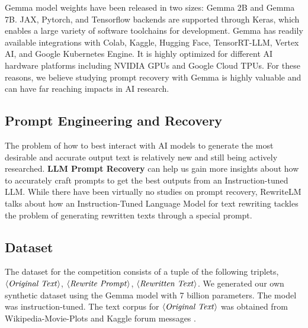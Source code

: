 \documentclass{article}
\theoremstyle{plain}
\theoremstyle{definition}
\theoremstyle{remark}
\begin{document}
Gemma model weights have been released in two sizes: Gemma 2B and Gemma 7B. JAX, Pytorch, and Tensorflow backends are supported through Keras, which enables a large variety of software toolchains for development. Gemma has readily available integrations with Colab, Kaggle, Hugging Face, TensorRT-LLM, Vertex AI, and Google Kubernetes Engine. It is highly optimized for different AI hardware platforms including NVIDIA GPUs and Google Cloud TPUs. For these reasons, we believe studying prompt recovery with Gemma is highly valuable and can have far reaching impacts in AI research.

\subsection{Prompt Engineering and Recovery}
The problem of how to best interact with AI models to generate the most desirable and accurate output text is relatively new and still being actively researched. \textbf{LLM Prompt Recovery} can help us gain more insights about how to accurately craft prompts to get the best outputs from an Instruction-tuned LLM. While there have been virtually no studies on prompt recovery, RewriteLM \cite{shu2023rewritelm} talks about how an Instruction-Tuned Language Model for text rewriting tackles the problem of generating rewritten texts through a special prompt.

\subsection{Dataset}
The dataset for the competition consists of a tuple of the following triplets, $\langle \text{\textit{Original Text}} \rangle$, $\langle \text{\textit{Rewrite Prompt}} \rangle$, $\langle \text{\textit{Rewritten Text}} \rangle$. We generated our own synthetic dataset using the Gemma \cite{googlegemma} model with 7 billion parameters. The model was instruction-tuned. The text corpus for $\langle \text{\textit{Original Text}} \rangle$ was obtained from Wikipedia-Movie-Plots and Kaggle forum messages \cite{jim_plotts_megan_risdal_2023}.

\end{document}
